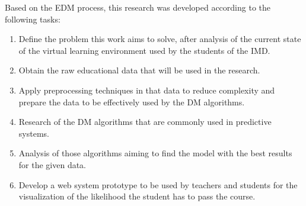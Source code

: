 Based on the EDM process, this research was developed according to the following tasks:

\begin{enumerate}
    \item Define the problem this work aims to solve, after analysis of the current state of the virtual learning environment used by the students of the IMD.
    \item Obtain the raw educational data that will be used in the research.
    \item Apply preprocessing techniques in that data to reduce complexity and prepare the data to be effectively used by the DM algorithms.
    \item Research of the DM algorithms that are commonly used in predictive systems.
    \item Analysis of those algorithms aiming to find the model with the best results for the given data.
    \item Develop a web system prototype to be used by teachers and students for the visualization of the likelihood the student has to pass the course.
\end{enumerate}